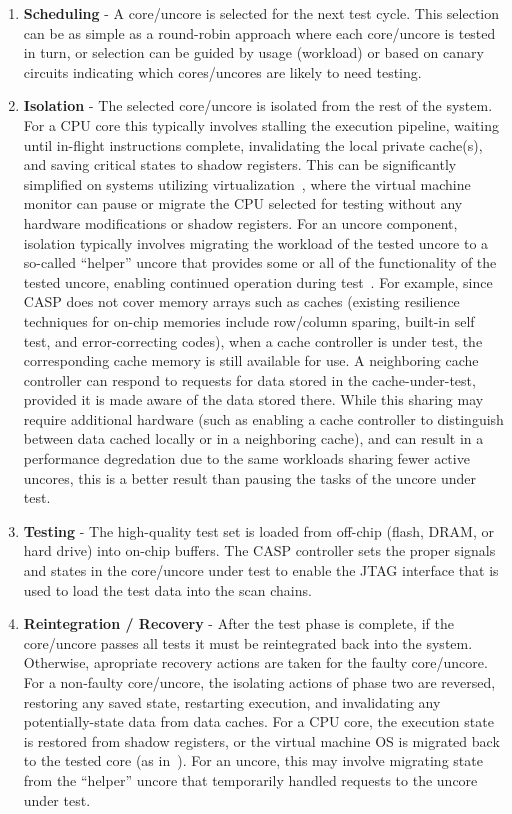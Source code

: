 \begin{enumerate}
\item \textbf{Scheduling} - A core/uncore is selected for the next test cycle.
%
This selection can be as simple as a round-robin approach where each core/uncore is tested in turn, or selection can be guided by usage (workload) or based on canary circuits indicating which cores/uncores are likely to need testing.
\item \textbf{Isolation} - The selected core/uncore is isolated from the rest of the system.
%
For a CPU core this typically involves stalling the execution pipeline, waiting until in-flight instructions complete, invalidating the local private cache(s), and saving critical states to shadow registers.
%
This can be significantly simplified on systems utilizing virtualization~\cite{inoue08}, where the virtual machine monitor can pause or migrate the CPU selected for testing without any hardware modifications or shadow registers.
%
For an uncore component, isolation typically involves migrating the workload of the tested uncore to a so-called ``helper'' uncore that provides some or all of the functionality of the tested uncore, enabling continued operation during test~\cite{li10}.
%
For example, since CASP does not cover memory arrays such as caches (existing resilience techniques for on-chip memories include row/column sparing, built-in self test, and error-correcting codes), when a cache controller is under test, the corresponding cache memory is still available for use.
%
A neighboring cache controller can respond to requests for data stored in the cache-under-test, provided it is made aware of the data stored there.
%
While this sharing may require additional hardware (such as enabling a cache controller to distinguish between data cached locally or in a neighboring cache), and can result in a performance degredation due to the same workloads sharing fewer active uncores, this is a better result than pausing the tasks of the uncore under test.
\item \textbf{Testing} - The high-quality test set is loaded from off-chip (flash, DRAM, or hard drive) into on-chip buffers.
%
The CASP controller sets the proper signals and states in the core/uncore under test to enable the JTAG interface that is used to load the test data into the scan chains.
%

\item \textbf{Reintegration / Recovery} - After the test phase is complete, if the core/uncore passes all tests it must be reintegrated back into the system.
%
Otherwise, apropriate recovery actions are taken for the faulty core/uncore.
%
For a non-faulty core/uncore, the isolating actions of phase two are reversed, restoring any saved state, restarting execution, and invalidating any potentially-state data from data caches.
%
For a CPU core, the execution state is restored from shadow registers, or the virtual machine OS is migrated back to the tested core (as in~\cite{inoue08}).
%
For an uncore, this may involve migrating state from the ``helper'' uncore that temporarily handled requests to the uncore under test.
\end{enumerate}

